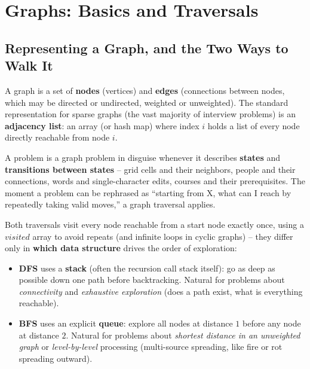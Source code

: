 \chapter{Graphs: Basics and Traversals}

\section{Representing a Graph, and the Two Ways to Walk It}
\label{sec:graph-basics-intro}

A graph is a set of \textbf{nodes} (vertices) and \textbf{edges}
(connections between nodes, which may be directed or undirected,
weighted or unweighted). The standard representation for sparse graphs
(the vast majority of interview problems) is an \textbf{adjacency
list}: an array (or hash map) where index $i$ holds a list of every
node directly reachable from node $i$.

\begin{patternbox}
A problem is a graph problem in disguise whenever it describes
\textbf{states} and \textbf{transitions between states} -- grid cells
and their neighbors, people and their connections, words and
single-character edits, courses and their prerequisites. The moment a
problem can be rephrased as ``starting from X, what can I reach by
repeatedly taking valid moves,'' a graph traversal applies.
\end{patternbox}

\begin{ideabox}
Both traversals visit every node reachable from a start node exactly
once, using a $\textit{visited}$ array to avoid repeats (and infinite
loops in cyclic graphs) -- they differ only in \textbf{which data
structure} drives the order of exploration:
\begin{itemize}
  \item \textbf{DFS} uses a \textbf{stack} (often the recursion call
        stack itself): go as deep as possible down one path before
        backtracking. Natural for problems about \emph{connectivity}
        and \emph{exhaustive exploration} (does a path exist, what is
        everything reachable).
  \item \textbf{BFS} uses an explicit \textbf{queue}: explore all
        nodes at distance $1$ before any node at distance $2$. Natural
        for problems about \emph{shortest distance in an unweighted
        graph} or \emph{level-by-level} processing (multi-source
        spreading, like fire or rot spreading outward).
\end{itemize}
\end{ideabox}

